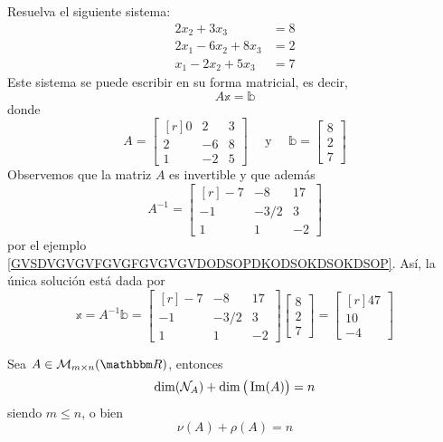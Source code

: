 \begin{example}
    Resuelva el siguiente sistema:
    \begin{align*}
        2x_2 + 3x_3 & = 8 \\
        2x_1 - 6x_2 + 8x_3 & = 2 \\
        x_1 - 2x_2 + 5x_3 & = 7
    \end{align*}\newpage
    \solucion Este sistema se puede escribir en su forma matricial, es decir,
    $$A \mathbb{x} = \mathbb{b}$$
    donde
    $$A = \begin{bmatrix*}[r]
        0 & 2 & 3 \\
        2 & -6 & 8 \\
        1 & -2 & 5
    \end{bmatrix*} \quad \text{ y } \quad \mathbb{b} = \begin{bmatrix}
        8 \\
        2 \\
        7
    \end{bmatrix}$$
    Observemos que la matriz $A$ es invertible y que además
    $$A^{-1} = \begin{bmatrix*}[r]
        -7 & -8 & 17 \\
        -1 & -3/2 & 3 \\
        1 & 1 & -2
    \end{bmatrix*}$$
    por el ejemplo \ref{GVSDVGVGVFGVGFGVGVGVDODSOPDKODSOKDSOKDSOP}. Así, la única solución está dada por
    $$\mathbb{x} = A^{-1}\mathbb{b} = \begin{bmatrix*}[r]
        -7 & -8 & 17 \\
        -1 & -3/2 & 3 \\
        1 & 1 & -2
    \end{bmatrix*} \begin{bmatrix}
        8 \\
        2 \\
        7
    \end{bmatrix} = \begin{bmatrix*}[r]
        47 \\
        10 \\
        -4
    \end{bmatrix*}$$
\end{example}

\begin{theorem}
    Sea $A \in \matrizmn$, entonces
    $$\operatorname{dim}(\mathcal{N}_A) + \operatorname{dim}\big( \operatorname{Im}(A) \big) = n$$
    siendo $m \leq n$, o bien
    $$\nu(A) + \rho(A) = n$$
\end{theorem}

